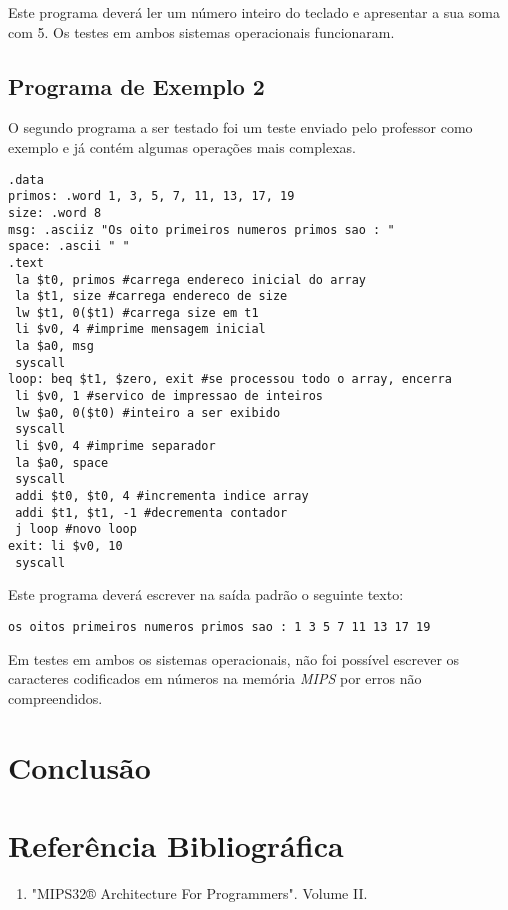 \documentclass[12pt, a4paper, twoside]{article}
\begin{document}
Este programa deverá ler um número inteiro do teclado e apresentar a sua soma
com 5. Os testes em ambos sistemas operacionais funcionaram.

\subsection{Programa de Exemplo 2}

O segundo programa a ser testado foi um teste enviado pelo professor como
exemplo e já contém algumas operações mais complexas.

\begin{lstlisting}[caption=Segundo teste]
.data
primos: .word 1, 3, 5, 7, 11, 13, 17, 19
size: .word 8
msg: .asciiz "Os oito primeiros numeros primos sao : "
space: .ascii " "
.text
 la $t0, primos #carrega endereco inicial do array
 la $t1, size #carrega endereco de size
 lw $t1, 0($t1) #carrega size em t1
 li $v0, 4 #imprime mensagem inicial
 la $a0, msg
 syscall
loop: beq $t1, $zero, exit #se processou todo o array, encerra
 li $v0, 1 #servico de impressao de inteiros
 lw $a0, 0($t0) #inteiro a ser exibido
 syscall
 li $v0, 4 #imprime separador
 la $a0, space
 syscall
 addi $t0, $t0, 4 #incrementa indice array
 addi $t1, $t1, -1 #decrementa contador
 j loop #novo loop
exit: li $v0, 10
 syscall
\end{lstlisting}

Este programa deverá escrever na saída padrão o seguinte texto:

\begin{lstlisting}
os oitos primeiros numeros primos sao : 1 3 5 7 11 13 17 19
\end{lstlisting}

Em testes em ambos os sistemas operacionais, não foi possível escrever os
caracteres codificados em números na memória \textit{MIPS} por erros não
compreendidos.

\section{Conclusão}


\section{Referência Bibliográfica}

\begin{enumerate}
    \item "MIPS32® Architecture For Programmers". Volume II.
\end{enumerate}
\end{document}
